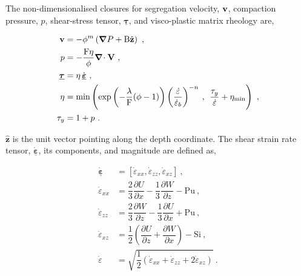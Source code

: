 \documentclass[12pt,a4paper]{article}
\begin{document}
The non-dimensionalised closures for  segregation velocity, $\mbox{{\bf v}}$, compaction pressure, $p$, shear-stress tensor, $\underline{\boldsymbol{\tau}}$, and visco-plastic matrix rheology are,
\begin{linenomath*}
\begin{subequations}
\label{eq:nondim-coeffs}
\begin{align}
	\label{eq:nondim-coeffs-segr}
	\mbox{{\bf v}} &= -\phi^m \left( \mbox{\boldmath $\nabla$} P + \mathrm{B} \hat{\mathbf{z}} \right) \ , \\
	\label{eq:nondim-coeffs-cpct}
	p &= -\dfrac{\mathrm{F} \eta}{\phi} \mbox{\boldmath $\nabla$}\!\cdot \mathbf{V} \ , \\
	\label{eq:nondim-coeffs-stress}
	\underline{\boldsymbol{\tau}} &= \eta \, \underline{\dot{\boldsymbol{\varepsilon}}} \ , \\
	\label{eq:nondim-coeffs-viscoplast}
	\eta &= \min\left( \exp \left(-\dfrac{\lambda} {\mathrm{F}} (\phi-1) \right) \left(\dfrac{\dot{\varepsilon}}{\dot{\varepsilon}_b} \right)^{-n} \: , \:\: \dfrac{\tau_y}{\dot{\varepsilon}} + \eta_\mathrm{min} \right) \ , \\
	\label{eq:nondim-coeffs-yield}
	\tau_y &= 1 + p \ .
\end{align}
\end{subequations}
\end{linenomath*}
$\hat{\mathbf{z}}$ is the unit vector pointing along the depth coordinate. The shear strain rate tensor, $\underline{\dot{\boldsymbol{\varepsilon}}}$, its components, and magnitude are defined as,
\begin{linenomath*}
\begin{subequations}
\label{eq:nondim-strainr}
\begin{align}
	\label{eq:nondim-strainr-comps}
	\underline{\dot{\boldsymbol{\varepsilon}}} &= [\dot{\varepsilon}_{xx},\dot{\varepsilon}_{zz},\dot{\varepsilon}_{xz}] \ , \\
	\label{eq:nondim-strainr-compxx}
	\dot{\varepsilon}_{xx} &= \dfrac{2}{3} \dfrac{\partial U}{\partial x} - \dfrac{1}{3} \dfrac{\partial W}{\partial z} - \mathrm{Pu} \ , \\
	\label{eq:nondim-strainr-compzz}
	\dot{\varepsilon}_{zz} &= \dfrac{2}{3} \dfrac{\partial W}{\partial z} - \dfrac{1}{3} \dfrac{\partial U}{\partial x} + \mathrm{Pu} \ , \\
	\label{eq:nondim-strainr-compxz}
	\dot{\varepsilon}_{xz} &= \dfrac{1}{2} \left( \dfrac{\partial U}{\partial z} + \dfrac{\partial W}{\partial x} \right) - \mathrm{Si} \ , \\
	\label{eq:nondim-strainr-magn}
	\dot{\varepsilon} &= \sqrt{\dfrac{1}{2} \left(\dot{\varepsilon}_{xx} + \dot{\varepsilon}_{zz} + 2 \dot{\varepsilon}_{xz} \right)} \ . 
\end{align}
\end{subequations}
\end{linenomath*}
\end{document}
